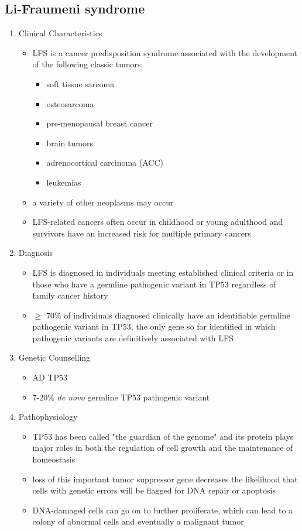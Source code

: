 \documentclass[12pt]{scrartcl}
\begin{document}
\subsection{Li-Fraumeni syndrome}
\label{sec:orgc76a188}
\begin{enumerate}
\item Clinical Characteristics
\label{sec:org2e66381}
\begin{itemize}
\item LFS is a cancer predisposition syndrome associated with the
development of the following classic tumors:
\begin{itemize}
\item soft tissue sarcoma
\item osteosarcoma
\item pre-menopausal breast cancer
\item brain tumors
\item adrenocortical carcinoma (ACC)
\item leukemias
\end{itemize}
\item a variety of other neoplasms may occur
\item LFS-related cancers often occur in childhood or young adulthood and
survivors have an increased risk for multiple primary cancers
\end{itemize}

\item Diagnosis
\label{sec:org2f788cc}
\begin{itemize}
\item LFS is diagnosed in individuals meeting established clinical
criteria or in those who have a germline pathogenic variant in TP53
regardless of family cancer history
\item \(\ge\) 70\% of individuals diagnosed clinically have an identifiable
germline pathogenic variant in TP53, the only gene so far identified
in which pathogenic variants are definitively associated with LFS
\end{itemize}
\item Genetic Counselling
\label{sec:org11ffaea}
\begin{itemize}
\item AD TP53
\item 7-20\% \emph{de novo} germline TP53 pathogenic variant
\end{itemize}

\item Pathophysiology
\label{sec:org496a636}
\begin{itemize}
\item TP53 has been called "the guardian of the genome" and its protein
plays major roles in both the regulation of cell growth and the
maintenance of homeostasis
\item loss of this important tumor suppressor gene decreases the
likelihood that cells with genetic errors will be flagged for DNA
repair or apoptosis
\item DNA-damaged cells can go on to further proliferate, which can lead
to a colony of abnormal cells and eventually a malignant tumor
\end{itemize}
\end{enumerate}
\end{document}
